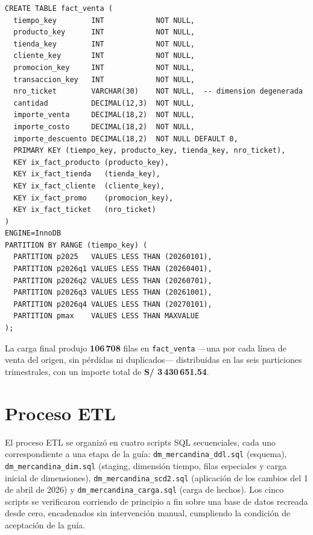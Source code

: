 \documentclass[11pt,a4paper]{article}
\begin{document}
\begin{lstlisting}[caption={DDL de \texttt{fact\_venta}: clave primaria igual al grano y particionamiento trimestral (\texttt{dm\_mercandina\_ddl.sql}).}, label={lst:ddl-fact}]
CREATE TABLE fact_venta (
  tiempo_key        INT            NOT NULL,
  producto_key      INT            NOT NULL,
  tienda_key        INT            NOT NULL,
  cliente_key       INT            NOT NULL,
  promocion_key     INT            NOT NULL,
  transaccion_key   INT            NOT NULL,
  nro_ticket        VARCHAR(30)    NOT NULL,  -- dimension degenerada
  cantidad          DECIMAL(12,3)  NOT NULL,
  importe_venta     DECIMAL(18,2)  NOT NULL,
  importe_costo     DECIMAL(18,2)  NOT NULL,
  importe_descuento DECIMAL(18,2)  NOT NULL DEFAULT 0,
  PRIMARY KEY (tiempo_key, producto_key, tienda_key, nro_ticket),
  KEY ix_fact_producto (producto_key),
  KEY ix_fact_tienda   (tienda_key),
  KEY ix_fact_cliente  (cliente_key),
  KEY ix_fact_promo    (promocion_key),
  KEY ix_fact_ticket   (nro_ticket)
)
ENGINE=InnoDB
PARTITION BY RANGE (tiempo_key) (
  PARTITION p2025   VALUES LESS THAN (20260101),
  PARTITION p2026q1 VALUES LESS THAN (20260401),
  PARTITION p2026q2 VALUES LESS THAN (20260701),
  PARTITION p2026q3 VALUES LESS THAN (20261001),
  PARTITION p2026q4 VALUES LESS THAN (20270101),
  PARTITION pmax    VALUES LESS THAN MAXVALUE
);
\end{lstlisting}

La carga final produjo \textbf{106\,708} filas en \texttt{fact\_venta} —una por cada línea de venta del origen, sin pérdidas ni duplicados— distribuidas en las seis particiones trimestrales, con un importe total de \textbf{S/ 3\,430\,651.54}.

\section{Proceso ETL}

El proceso ETL se organizó en cuatro scripts SQL secuenciales, cada uno correspondiente a una etapa de la guía: \texttt{dm\_mercandina\_ddl.sql} (esquema), \texttt{dm\_mercandina\_dim.sql} (staging, dimensión tiempo, filas especiales y carga inicial de dimensiones), \texttt{dm\_mercandina\_scd2.sql} (aplicación de los cambios del 1 de abril de 2026) y \texttt{dm\_mercandina\_carga.sql} (carga de hechos). Los cinco scripts se verificaron corriendo de principio a fin sobre una base de datos recreada desde cero, encadenados sin intervención manual, cumpliendo la condición de aceptación de la guía.
\end{document}
